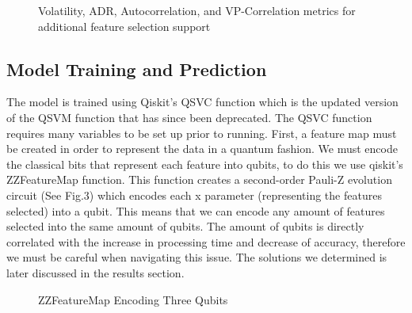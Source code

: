 \documentclass{article}
\begin{document}
\begin{figure}[H]
    \centering
    \caption{Volatility, ADR, Autocorrelation, and VP-Correlation metrics for additional feature selection support}
    \label{fig:2}
\end{figure}
\subsection*{Model Training and Prediction}
The model is trained using Qiskit's QSVC function which is the updated version of the QSVM function that has since been deprecated. The QSVC function requires many variables to be set up prior to running. First, a feature map must be created in order to represent the data in a quantum fashion. We must encode the classical bits that represent each feature into qubits, to do this we use qiskit's ZZFeatureMap function. This function creates a second-order Pauli-Z evolution circuit (See Fig.3) which encodes each x parameter (representing the features selected) into a qubit. This means that we can encode any amount of features selected into the same amount of qubits. The amount of qubits is directly correlated with the increase in processing time and decrease of accuracy, therefore we must be careful when navigating this issue. 
The solutions we determined is later discussed in the results section. 
\begin{figure}[H]
    \centering
    \caption{ZZFeatureMap Encoding Three Qubits}
    \label{fig:3}
\end{figure}
\end{document}
